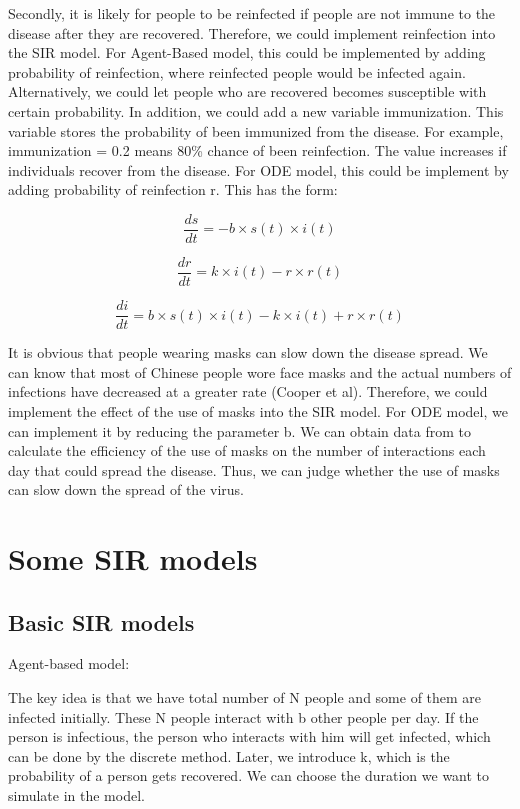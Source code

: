 \documentclass[11pt,a4paper]{article}
\begin{document}
\medskip \noindent
Secondly, it is likely for people to be reinfected if people are not immune to the disease after they are recovered. Therefore, we could implement reinfection into the SIR model. For Agent-Based model, this could be implemented by adding probability of reinfection, where reinfected people would be infected again. Alternatively, we could let people who are recovered becomes susceptible with certain probability. In addition, we could add a new variable immunization. This variable stores the probability of been immunized from the disease. For example, immunization = 0.2 means 80\% chance of been reinfection. The value increases if individuals recover from the disease. For ODE model, this could be implement by adding probability of reinfection r. This has the form: 

$$\frac{ds}{dt} = -b \times s(t) \times i(t)$$

$$\frac{dr}{dt} = k \times i(t) - r \times r(t)$$

$$\frac{di}{dt} = b \times s(t) \times i(t) - k \times i(t) + r \times r(t)$$


\medskip \noindent
It is obvious that people wearing masks can slow down the disease spread. We can know that most of Chinese people wore face masks and the actual numbers of infections have decreased at a greater rate (Cooper et al). Therefore, we could implement the effect of the use of masks into the SIR model. For ODE model, we can implement it by reducing the parameter b. We can obtain data from to calculate the efficiency of the use of masks on the number of interactions each day that could spread the disease. Thus, we can judge whether the use of masks can slow down the spread of the virus.


\section*{Some SIR models }
\subsection*{Basic SIR models}
{Agent-based model}:

\medskip \noindent
The key idea is that we have total number of N people and some of them are infected initially. These N people interact with b other people per day. If the person is infectious, the person who interacts with him will get infected, which can be done by the discrete method. Later, we introduce k, which is the probability of a person gets recovered. We can choose the duration we want to simulate in the model.
\end{document}
